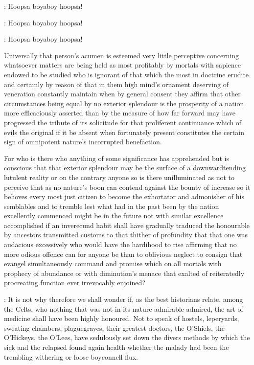 \documentclass[12pt]{article}
\begin{document}
\Nurses: Hoopsa boyaboy hoopsa!

\Nurses: Hoopsa boyaboy hoopsa!

\Nurses: Hoopsa boyaboy hoopsa!


Universally that person's acumen is esteemed very little perceptive
concerning whatsoever matters are being held as most profitably by mortals
with sapience endowed to be studied who is ignorant of that which the most
in doctrine erudite and certainly by reason of that in them high mind's
ornament deserving of veneration constantly maintain when by general
consent they affirm that other circumstances being equal by no exterior
splendour is the prosperity of a nation more efficaciously asserted than
by the measure of how far forward may have progressed the tribute of its
solicitude for that proliferent continuance which of evils the original if
it be absent when fortunately present constitutes the certain sign of
omnipotent nature's incorrupted benefaction.

For who is there who anything
of some significance has apprehended but is conscious that that exterior
splendour may be the surface of a downwardtending lutulent reality or on
the contrary anyone so is there unilluminated as not to perceive that as
no nature's boon can contend against the bounty of increase so it behoves
every most just citizen to become the exhortator and admonisher of his
semblables and to tremble lest what had in the past been by the nation
excellently commenced might be in the future not with similar excellence
accomplished if an inverecund habit shall have gradually traduced the
honourable by ancestors transmitted customs to that thither of profundity
that that one was audacious excessively who would have the hardihood to
rise affirming that no more odious offence can for anyone be than to
oblivious neglect to consign that evangel simultaneously command and
promise which on all mortals with prophecy of abundance or with
diminution's menace that exalted of reiteratedly procreating function ever
irrevocably enjoined?


: It is not why therefore we shall wonder if, as the best historians
relate, among the Celts, who nothing that was not in its nature admirable
admired, the art of medicine shall have been highly honoured. Not to speak
of hostels, leperyards, sweating chambers, plaguegraves, their greatest
doctors, the O'Shiels, the O'Hickeys, the O'Lees, have sedulously set down
the divers methods by which the sick and the relapsed found again health
whether the malady had been the trembling withering or loose boyconnell
flux.
\end{document}
